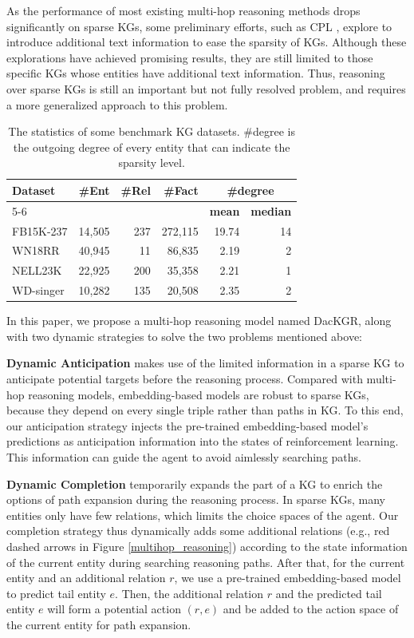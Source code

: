 \documentclass[11pt,a4paper]{article}
\newcommand{\tworow}[1]{\multirow{2}{*}{#1}}
\newcommand{\twocol}[1]{\multicolumn{2}{c}{#1}}
\begin{document}
As the performance of most existing multi-hop reasoning methods drops significantly on sparse KGs, some preliminary efforts, such as CPL \cite{CPL}, explore to introduce additional text information to ease the sparsity of KGs. Although these explorations have achieved promising results, they are still limited to those specific KGs whose entities have additional text information. Thus, reasoning over sparse KGs is still an important but not fully resolved problem, and requires a more generalized approach to this problem.


\begin{table}
  \small
  \centering
  \setlength\tabcolsep{4pt}
  \begin{tabular}{lrrrrr}
    \toprule
    \tworow{\textbf{Dataset}} & \tworow{\textbf{\#Ent}} & \tworow{\textbf{\#Rel}} & \tworow{\textbf{\#Fact}} & \twocol{\textbf{\#degree}} \\
    \cline{5-6}
      & & & & \textbf{mean} & \textbf{median} \\
      \midrule 
      FB15K-237 & 14,505 & 237 & 272,115 & 19.74 & 14 \\
      WN18RR & 40,945 & 11 & 86,835 & 2.19 & 2 \\
      NELL23K & 22,925 & 200 & 35,358 & 2.21 & 1 \\
      WD-singer & 10,282 & 135 & 20,508 & 2.35 & 2 \\
      \bottomrule
  \end{tabular}
  \caption{The statistics of some benchmark KG datasets. \#degree is the outgoing degree of every entity that can indicate the sparsity level.}
  \label{dataset_statistic}
\end{table}

In this paper, we propose a multi-hop reasoning model named DacKGR, along with two dynamic strategies to solve the two problems mentioned above:

\textbf{Dynamic Anticipation} makes use of the limited information in a sparse KG to anticipate potential targets before the reasoning process. 
Compared with multi-hop reasoning models, embedding-based models are robust to sparse KGs, because they depend on every single triple rather than paths in KG. 
To this end, our anticipation strategy injects the pre-trained embedding-based model's predictions as anticipation information into the states of reinforcement learning. This information can guide the agent to avoid aimlessly searching paths.

 
 \textbf{Dynamic Completion} temporarily expands the part of a KG to enrich the options of path expansion during the reasoning process. In sparse KGs, many entities only have few relations, which limits the choice spaces of the agent. Our completion strategy thus dynamically adds some additional relations (e.g., red dashed arrows in Figure \ref{multihop_reasoning}) according to the state information of the current entity during searching reasoning paths. After that, for the current entity and an additional relation $r$, we use a pre-trained embedding-based model to predict tail entity $e$. Then, the additional relation $r$ and the predicted tail entity $e$ will form a potential action $(r, e)$ and be added to the action space of the current entity for path expansion. 
 
\end{document}
